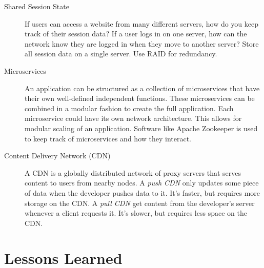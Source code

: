 \begin{description}
	\item[Shared Session State] If users can access a website from many different servers, how do you keep track of their session data? If a user logs in on one server, how can the network know they are logged in when they move to another server? Store all session data on a single server. Use RAID for redundancy.
	
	\item[Microservices] An application can be structured as a collection of microservices that have their own well-defined independent functions. These microservices can be combined in a modular fashion to create the full application. Each microservice could have its own network architecture. This allows for modular scaling of an application. Software like Apache Zookeeper is used to keep track of microservices and how they interact.
	
	\item[Content Delivery Network (CDN)] A CDN is a globally distributed network of proxy servers that serves content to users from nearby nodes. A \textit{push CDN} only updates some piece of data when the developer pushes data to it. It's faster, but requires more storage on the CDN. A \textit{pull CDN} get content from the developer's server whenever a client requests it. It's slower, but requires less space on the CDN.
\end{description}

\newpage


\toclineskip
\section{Lessons Learned}

